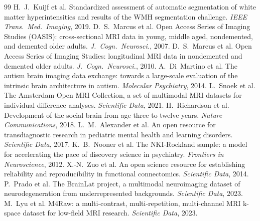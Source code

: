 \documentclass[10pt]{article}
\begin{document}
\begin{thebibliography}{99}
 H.~J.~Kuijf et al. Standardized assessment of automatic segmentation of white matter hyperintensities and results of the WMH segmentation challenge. \emph{IEEE Trans.\ Med.\ Imaging}, 2019.
 D.~S.~Marcus et al. Open Access Series of Imaging Studies (OASIS): cross-sectional MRI data in young, middle aged, nondemented, and demented older adults. \emph{J.\ Cogn.\ Neurosci.}, 2007.
 D.~S.~Marcus et al. Open Access Series of Imaging Studies: longitudinal MRI data in nondemented and demented older adults. \emph{J.\ Cogn.\ Neurosci.}, 2010.
 A.~Di~Martino et al. The autism brain imaging data exchange: towards a large-scale evaluation of the intrinsic brain architecture in autism. \emph{Molecular Psychiatry}, 2014.
 L.~Snoek et al. The Amsterdam Open MRI Collection, a set of multimodal MRI datasets for individual difference analyses. \emph{Scientific Data}, 2021.
 H.~Richardson et al. Development of the social brain from age three to twelve years. \emph{Nature Communications}, 2018.
 L.~M.~Alexander et al. An open resource for transdiagnostic research in pediatric mental health and learning disorders. \emph{Scientific Data}, 2017.
 K.~B.~Nooner et al. The NKI-Rockland sample: a model for accelerating the pace of discovery science in psychiatry. \emph{Frontiers in Neuroscience}, 2012.
 X.-N.~Zuo et al. An open science resource for establishing reliability and reproducibility in functional connectomics. \emph{Scientific Data}, 2014.
 P.~Prado et al. The BrainLat project, a multimodal neuroimaging dataset of neurodegeneration from underrepresented backgrounds. \emph{Scientific Data}, 2023.
 M.~Lyu et al. M4Raw: a multi-contrast, multi-repetition, multi-channel MRI k-space dataset for low-field MRI research. \emph{Scientific Data}, 2023.
\end{thebibliography}
\end{document}
